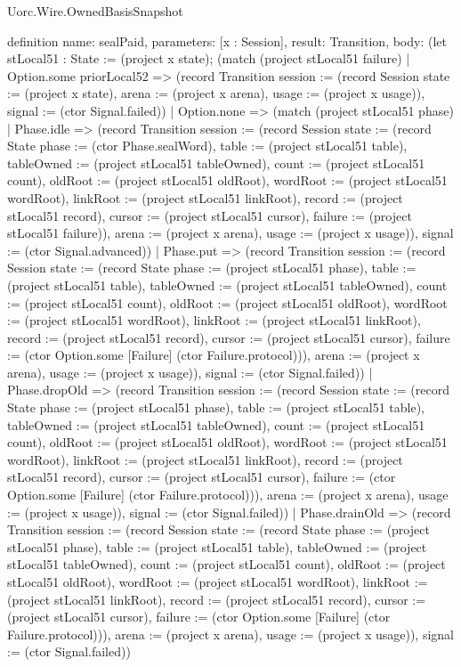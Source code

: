 \begin{lexlean}{Uorc.Wire.OwnedBasisSnapshot}
\begin{semanticmodule}
definition{
  name: sealPaid,
  parameters: [x : Session],
  result: Transition,
  body: (let stLocal51 : State := (project x state); (match (project stLocal51 failure)
    | Option.some priorLocal52 => (record Transition {session := (record Session {state := (project x state), arena := (project x arena), usage := (project x usage)}), signal := (ctor Signal.failed)})
    | Option.none => (match (project stLocal51 phase)
      | Phase.idle => (record Transition {session := (record Session {state := (record State {phase := (ctor Phase.sealWord), table := (project stLocal51 table), tableOwned := (project stLocal51 tableOwned), count := (project stLocal51 count), oldRoot := (project stLocal51 oldRoot), wordRoot := (project stLocal51 wordRoot), linkRoot := (project stLocal51 linkRoot), record := (project stLocal51 record), cursor := (project stLocal51 cursor), failure := (project stLocal51 failure)}), arena := (project x arena), usage := (project x usage)}), signal := (ctor Signal.advanced)})
      | Phase.put => (record Transition {session := (record Session {state := (record State {phase := (project stLocal51 phase), table := (project stLocal51 table), tableOwned := (project stLocal51 tableOwned), count := (project stLocal51 count), oldRoot := (project stLocal51 oldRoot), wordRoot := (project stLocal51 wordRoot), linkRoot := (project stLocal51 linkRoot), record := (project stLocal51 record), cursor := (project stLocal51 cursor), failure := (ctor Option.some [Failure] (ctor Failure.protocol))}), arena := (project x arena), usage := (project x usage)}), signal := (ctor Signal.failed)})
      | Phase.dropOld => (record Transition {session := (record Session {state := (record State {phase := (project stLocal51 phase), table := (project stLocal51 table), tableOwned := (project stLocal51 tableOwned), count := (project stLocal51 count), oldRoot := (project stLocal51 oldRoot), wordRoot := (project stLocal51 wordRoot), linkRoot := (project stLocal51 linkRoot), record := (project stLocal51 record), cursor := (project stLocal51 cursor), failure := (ctor Option.some [Failure] (ctor Failure.protocol))}), arena := (project x arena), usage := (project x usage)}), signal := (ctor Signal.failed)})
      | Phase.drainOld => (record Transition {session := (record Session {state := (record State {phase := (project stLocal51 phase), table := (project stLocal51 table), tableOwned := (project stLocal51 tableOwned), count := (project stLocal51 count), oldRoot := (project stLocal51 oldRoot), wordRoot := (project stLocal51 wordRoot), linkRoot := (project stLocal51 linkRoot), record := (project stLocal51 record), cursor := (project stLocal51 cursor), failure := (ctor Option.some [Failure] (ctor Failure.protocol))}), arena := (project x arena), usage := (project x usage)}), signal := (ctor Signal.failed)})
}
\end{semanticmodule}
\end{lexlean}
